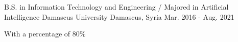 

\begin{cventries}

  \cventry
    {B.S. in Information Technology and Engineering / Majored in Artificial Intelligence} %
    {Damascus University} %
    {Damascus, Syria} %
    {Mar. 2016 - Aug. 2021} %
    {
      \begin{cvitems} %
        \item {With a percentage of 80\%}
      \end{cvitems}
    }

\end{cventries}
